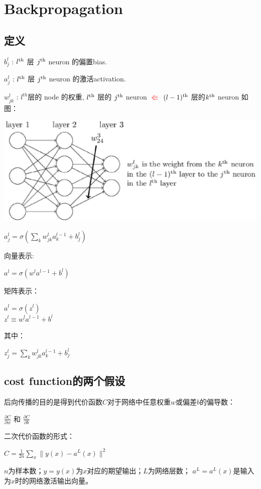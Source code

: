\chapter{Backpropagation}
\cite{chapter2}

\section{定义}
$b^l_j$ : $l^{\rm th}$ 层 $j^{\rm th}$ neuron 的偏置bias. \par
$a^l_j$ : $l^{\rm th}$ 层 $j^{\rm th}$ neuron 的激活activation.

$w^l_{jk}$ : $l^{th}$层的 node 的权重,
$l^{\rm th}$ 层的 $j^{\rm th}$ neuron \textcolor{red}{$\Lleftarrow$}
$(l-1)^{\rm th}$ 层的$k^{\rm th}$ neuron
如图：\par
\includegraphics[scale=0.5]{fig/weight_definition.eps}

\centerline {$a^{l}_j = \sigma\left(\sum_k w^{l}_{jk} a^{l-­1}_k + b^l_j \right)$}
向量表示:\par
\centerline{$a^{l} =\sigma(w^l a^{l-­1}+b^l)$}
矩阵表示：
\begin{center}
$a^l = \sigma(z^l)$\\
$z^l \equiv w^l a^{l-­1}+b^l$
\end{center}
其中：\par
\centerline{$z^l_j = \sum_k w^l_{jk} a^{l­-1}_k+b^l_j$}

\section{cost function的两个假设}
后向传播的目的是得到代价函数$C$对于网络中任意权重$w$或偏差$b$的偏导数：\par
\centerline{$\frac {\partial C}{\partial w}$ 和 $\frac{\partial C}{\partial b}$}

二次代价函数的形式：\par
\centerline{$C=\frac{1}{2n}\sum_x \|y(x)-­a^L(x)\|^2$}\par
\noindent$n$为样本数；$y=y(x)$为$x$对应的期望输出；$L$为网络层数；
$a^L=a^L(x)$是输入为$x$时的网络激活输出向量。

